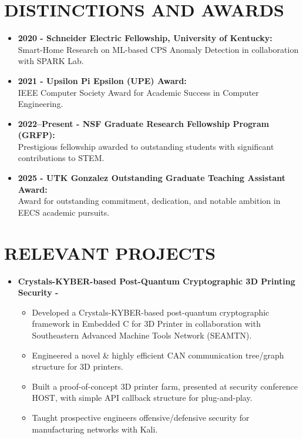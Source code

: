 \documentclass[line,margin,9pt]{res}
\begin{document}
\begin{resume}
\begin{itemize}
\end{itemize}

\section{DISTINCTIONS AND AWARDS}
\begin{itemize}
\item \textbf{2020 - Schneider Electric Fellowship, University of Kentucky:} \\
Smart-Home Research on ML-based CPS Anomaly Detection in collaboration with SPARK Lab.
\item \textbf{2021 - Upsilon Pi Epsilon (UPE) Award:} \\
IEEE Computer Society Award for Academic Success in Computer Engineering.
\item \textbf{2022--Present - NSF Graduate Research Fellowship Program (GRFP):} \\
Prestigious fellowship awarded to outstanding students with significant contributions to STEM.
\item \textbf{2025 - UTK Gonzalez Outstanding Graduate Teaching Assistant Award: } \\
Award for outstanding commitment, dedication, and notable ambition in EECS academic pursuits.
\end{itemize}

\section{RELEVANT PROJECTS}
\begin{itemize}

\item \textbf{Crystals-KYBER-based Post-Quantum Cryptographic 3D Printing Security -} 
\begin{itemize}
\item Developed a Crystals-KYBER-based post-quantum cryptographic framework in Embedded C for 3D Printer in collaboration with Southeastern Advanced Machine Tools Network (SEAMTN).
\item Engineered a novel \& highly efficient CAN communication tree/graph structure for 3D printers.
\item Built a proof-of-concept 3D printer farm, presented at security conference HOST, with simple API callback structure for plug-and-play.
\item Taught prospective engineers offensive/defensive security for manufacturing networks with Kali.
\end{itemize}


\end{itemize}
\end{resume}
\end{document}
